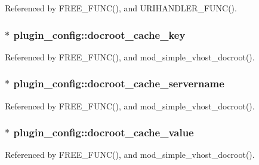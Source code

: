 Referenced by F\-R\-E\-E\-\_\-\-F\-U\-N\-C(), and U\-R\-I\-H\-A\-N\-D\-L\-E\-R\-\_\-\-F\-U\-N\-C().

\hypertarget{structplugin__config_aced1c921d3daf96fb443821f19420a98}{
\subsubsection[{docroot\-\_\-cache\-\_\-key}]{$\ast$ plugin\-\_\-config\-::docroot\-\_\-cache\-\_\-key}}\label{structplugin__config_aced1c921d3daf96fb443821f19420a98}


Referenced by F\-R\-E\-E\-\_\-\-F\-U\-N\-C(), and mod\-\_\-simple\-\_\-vhost\-\_\-docroot().

\hypertarget{structplugin__config_a76c0e6a6dc25c344441e75feeb7b673f}{
\subsubsection[{docroot\-\_\-cache\-\_\-servername}]{$\ast$ plugin\-\_\-config\-::docroot\-\_\-cache\-\_\-servername}}\label{structplugin__config_a76c0e6a6dc25c344441e75feeb7b673f}


Referenced by F\-R\-E\-E\-\_\-\-F\-U\-N\-C(), and mod\-\_\-simple\-\_\-vhost\-\_\-docroot().

\hypertarget{structplugin__config_a200b47985e662bd13047a2118952e62e}{
\subsubsection[{docroot\-\_\-cache\-\_\-value}]{$\ast$ plugin\-\_\-config\-::docroot\-\_\-cache\-\_\-value}}\label{structplugin__config_a200b47985e662bd13047a2118952e62e}


Referenced by F\-R\-E\-E\-\_\-\-F\-U\-N\-C(), and mod\-\_\-simple\-\_\-vhost\-\_\-docroot().

